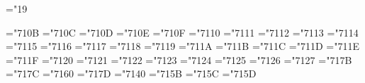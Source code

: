 
\chardef\sharps="19


\mathchardef\alpha="710B
\mathchardef\beta="710C
\mathchardef\gamma="710D
\mathchardef\delta="710E
\mathchardef\epsilon="710F
\mathchardef\zeta="7110
\mathchardef\eta="7111
\mathchardef\theta="7112
\mathchardef\iota="7113
\mathchardef\kappa="7114
\mathchardef\lambda="7115
\mathchardef\mu="7116
\mathchardef\nu="7117
\mathchardef\xi="7118
\mathchardef\pi="7119
\mathchardef\rho="711A
\mathchardef\sigma="711B
\mathchardef\tau="711C
\mathchardef\upsilon="711D
\mathchardef\phi="711E
\mathchardef\chi="711F
\mathchardef\psi="7120
\mathchardef\omega="7121
\mathchardef\varepsilon="7122
\mathchardef\vartheta="7123
\mathchardef\varpi="7124
\mathchardef\varrho="7125
\mathchardef\varsigma="7126
\mathchardef\varphi="7127
\mathchardef\imath="717B
\mathchardef\jmath="717C
\mathchardef\ell="7160
\mathchardef\wp="717D
\mathchardef\partial="7140
\mathchardef\flat="715B
\mathchardef\natural="715C
\mathchardef\sharp="715D
\def\vec{\mathaccent"717E }



